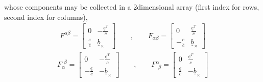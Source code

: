 \documentclass[letterpaper,10pt,english]{jupyterBook}
\begin{document}
\sphinxAtStartPar
whose components may be collected in a 2\sphinxhyphen{}dimensional array (first index for rows, second index for columns),
\begin{equation*}
\begin{split}F^{\alpha \beta} = 
\begin{bmatrix}
                        0 & -\frac{\underline{e}^T}{c} \\
  \frac{\underline{e}}{c} & \underline{b}_{\times}
\end{bmatrix}
\qquad , \qquad 
F_{\alpha \beta} = 
\begin{bmatrix}
                        0 & \frac{\underline{e}^T}{c} \\
 -\frac{\underline{e}}{c} & \underline{b}_{\times}
\end{bmatrix}
\end{split}
\end{equation*}\begin{equation*}
\begin{split}
F_{\alpha}^{\ \ \beta} = 
\begin{bmatrix}
                        0 &-\frac{\underline{e}^T}{c} \\
 -\frac{\underline{e}}{c} &-\underline{b}_{\times}
\end{bmatrix}
\qquad , \qquad 
F^{\alpha}_{\ \ \beta} = 
\begin{bmatrix}
                        0 & \frac{\underline{e}^T}{c} \\
  \frac{\underline{e}}{c} &-\underline{b}_{\times}
\end{bmatrix}
\end{split}
\end{equation*}
\end{document}
